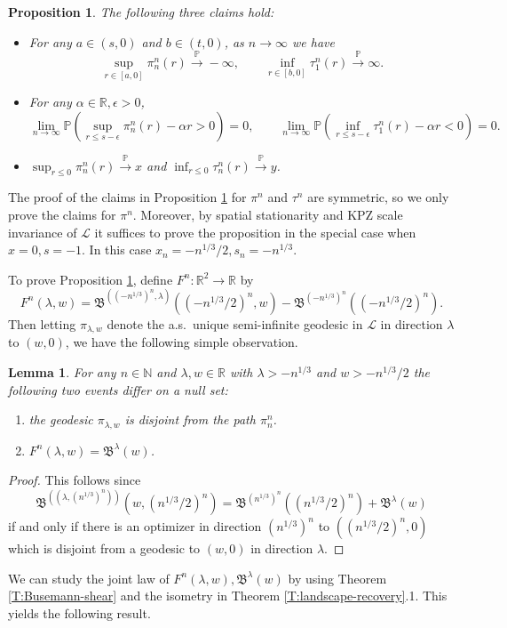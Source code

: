 \documentclass[11pt]{article}
\newcommand{\N}{\mathbb{N}}
\newcommand{\R}{\mathbb{R}}
\newcommand{\ep}{\epsilon}
\newcommand{\la}{\lambda}
\newcommand{\al}{\alpha}
\newcommand{\cL}{\mathcal{L}}
\newcommand{\fB}{\mathfrak{B}}
\newcommand{\cvgp}{\stackrel{\mathbb{P}}{\to}}
\renewcommand{\P}{\mathbb{P}}
\newtheorem{lemma}[theorem]{Lemma}
\newtheorem{proposition}[theorem]{Proposition}
\theoremstyle{definition} %
\theoremstyle{remark} %
\begin{document}
\begin{proposition}
	\label{P:slit-existence}
The following three claims hold:
	\begin{itemize}
	\item For any $a \in (s, 0)$ and $b \in (t, 0)$, as $n \to \infty$ we have
	$$
	\sup_{r \in [a, 0]} \pi^n_n(r) \cvgp -\infty, \qquad 	\inf_{r \in [b,0]} \tau^n_1(r) \cvgp \infty.
	$$
	\item For any $\al \in \R, \ep > 0$, 
	$$
	\lim_{n \to \infty} \P(\sup_{r \le s - \ep} \pi^n_n(r) - \al r > 0) = 0, \qquad \lim_{n \to \infty} \P(\inf_{r \le s - \ep} \tau^n_1(r) - \al r < 0) = 0.
	$$
	\item $\sup_{r \le 0} \pi^n_n(r) \cvgp x$ and $\inf_{r \le 0} \tau^n_n(r) \cvgp y$. 
\end{itemize} 
\end{proposition}
The proof of the claims in Proposition \ref{P:slit-existence} for $\pi^n$ and $\tau^n$ are symmetric, so we only prove the claims for $\pi^n$. Moreover, by spatial stationarity and KPZ scale invariance of $\cL$ it suffices to prove the proposition in the special case when $x = 0, s = -1$. In this case $x_n = -n^{1/3}/2, s_n = -n^{1/3}$. 

To prove Proposition \ref{P:slit-existence}, define $F^n:\R^2 \to \R$ by
$$
F^n(\la, w) = \fB^{((-n^{1/3})^n, \la)}((-n^{1/3}/2)^n,w) - \fB^{(-n^{1/3})^n}((-n^{1/3}/2)^n). 
$$
Then letting $\pi_{\la, w}$ denote the a.s.\ unique semi-infinite geodesic in $\cL$ in direction $\la$ to $(w, 0)$, we have the following simple observation.

\begin{lemma}
\label{L:Fnab}
For any $n \in \N$ and $\la, w \in \R$ with $\la > -n^{1/3}$ and $w > - n^{1/3}/2$ the following two events differ on a null set:
\begin{enumerate}
	\item the geodesic $\pi_{\la, w}$ is disjoint from the path $\pi^n_n$.
	\item $F^n(\la, w) = \fB^\la(w)$.
\end{enumerate}
\end{lemma}


\begin{proof}
This follows since 
$$
\fB^{((\la, (n^{1/3})^n))}(w, (n^{1/3}/2)^n) = \fB^{(n^{1/3})^n}((n^{1/3}/2)^n) + \fB^\la(w)
$$	
if and only if there is an optimizer in direction $(n^{1/3})^n$ to $((n^{1/3}/2)^n, 0)$ which is disjoint from a geodesic to $(w, 0)$ in direction $\la$. 
\end{proof}
We can study the joint law of $F^n(\la, w), \fB^\la(w)$ by using Theorem \ref{T:Busemann-shear} and the isometry in Theorem \ref{T:landscape-recovery}.1. This yields the following result.
\end{document}

